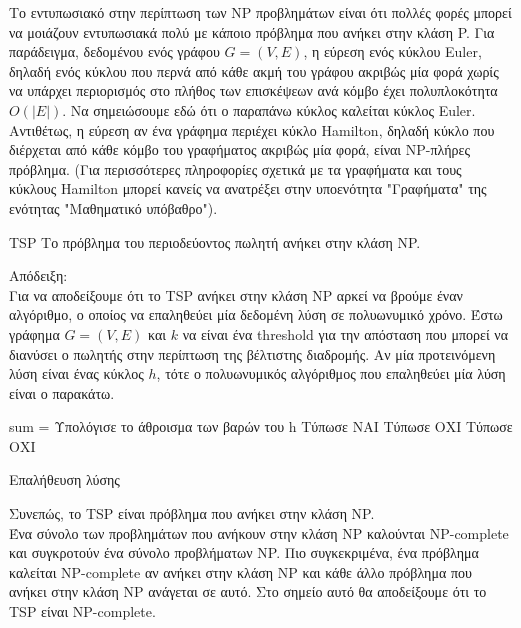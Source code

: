 \documentclass[oneside,12pt]{book}
\theoremstyle{definition}
\begin{document}
Το εντυπωσιακό στην περίπτωση των NP προβλημάτων είναι ότι πολλές φορές μπορεί να μοιάζουν εντυπωσιακά πολύ με κάποιο πρόβλημα που ανήκει στην κλάση P. Για παράδειγμα, δεδομένου ενός γράφου \(G = (V,E)\), η εύρεση ενός κύκλου Euler, δηλαδή ενός κύκλου που περνά από κάθε ακμή του γράφου ακριβώς μία φορά χωρίς να υπάρχει περιορισμός στο πλήθος των επισκέψεων ανά κόμβο έχει πολυπλοκότητα \(Ο(|Ε|)\). Να σημειώσουμε εδώ ότι ο παραπάνω κύκλος καλείται κύκλος Euler. Αντιθέτως, η εύρεση αν ένα γράφημα περιέχει κύκλο Hamilton, δηλαδή κύκλο που διέρχεται από κάθε κόμβο του γραφήματος ακριβώς μία φορά, είναι NP-πλήρες πρόβλημα. (Για περισσότερες πληροφορίες σχετικά με τα γραφήματα και τους κύκλους Hamilton μπορεί κανείς να ανατρέξει στην υποενότητα "Γραφήματα" της ενότητας "Μαθηματικό υπόβαθρο"). \\ 

\begin{mylemma}{TSP}{}
	Tο πρόβλημα του περιοδεύοντος πωλητή ανήκει στην κλάση NP.	
\end{mylemma}
 
Απόδειξη: \\
Για να αποδείξουμε ότι το TSP ανήκει στην κλάση NP αρκεί να βρούμε έναν αλγόριθμο, ο οποίος να επαληθεύει μία δεδομένη λύση σε πολυωνυμικό χρόνο. Έστω γράφημα \(G = (V,E)\) και \(k\) να είναι ένα threshold για την απόσταση που μπορεί να διανύσει ο πωλητής στην περίπτωση της βέλτιστης διαδρομής. Αν μία προτεινόμενη λύση είναι ένας κύκλος \(h\), τότε ο πολυωνυμικός αλγόριθμος που επαληθεύει μία λύση είναι ο παρακάτω. 

\begin{algorithm}[H]
	\SetAlgoLined
	
	{
		sum = Υπολόγισε το άθροισμα των βαρών του h \;
		{
			Τύπωσε ΝΑΙ \;
		}
		\Else
		{
			Τύπωσε ΟΧΙ \;}
		}
	\Else
	{
		Τύπωσε ΟΧΙ \;
	}
	
	\caption{Επαλήθευση λύσης}
\end{algorithm}

Συνεπώς, το TSP είναι πρόβλημα που ανήκει στην κλάση NP. \\

Ένα σύνολο των προβλημάτων που ανήκουν στην κλάση NP καλούνται NP-complete και συγκροτούν ένα σύνολο προβλήματων NP. Πιο συγκεκριμένα, ένα πρόβλημα καλείται NP-complete αν ανήκει στην κλάση NP και κάθε άλλο πρόβλημα που ανήκει στην κλάση NP ανάγεται σε αυτό. Στο σημείο αυτό θα αποδείξουμε ότι το TSP είναι NP-complete. \\
\end{document}
